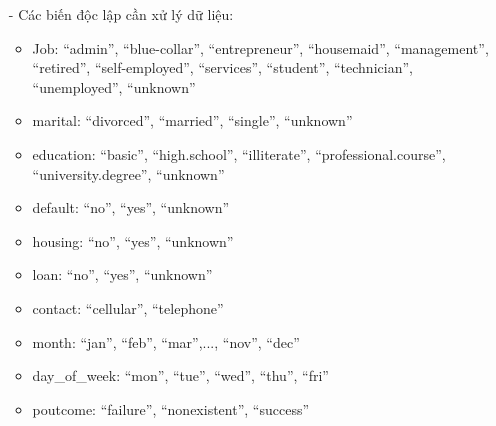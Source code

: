\documentclass{report}
\newcommand\tab[1][1.25cm]{\hspace*{#1}}
\begin{document}
\begin{enumerate}
                    \item [- ] Các biến độc lập cần xử lý dữ liệu:
                        \begin{itemize}
                            \item Job:
                                \newline\tab “admin”, “blue-collar”, “entrepreneur”, “housemaid”,
                                \newline\tab “management”, “retired”, “self-employed”, “services”,
                                \newline\tab “student”, “technician”, “unemployed”, “unknown”
                            \item marital:
                                \newline\tab “divorced”, “married”, “single”, “unknown”
                            \item education:
                                \newline\tab “basic”, “high.school”, “illiterate”, “professional.course”, 
                                \newline\tab “university.degree”, “unknown”
                            \item default:
                                \newline\tab “no”, “yes”, “unknown”
                                
                            \item housing:
                                \newline\tab “no”, “yes”, “unknown”
                            \item loan:
                                \newline\tab “no”, “yes”, “unknown”
                            \item contact:
                                \newline\tab “cellular”, “telephone”
                            \item month:
                                \newline\tab “jan”, “feb”, “mar”,..., “nov”, “dec”
                            \item day\_of\_week:
                                \newline\tab “mon”, “tue”, “wed”, “thu”, “fri”
                            \item poutcome:
                                \newline\tab “failure”, “nonexistent”, “success”
                        \end{itemize}
                        

\end{enumerate}
\end{document}
